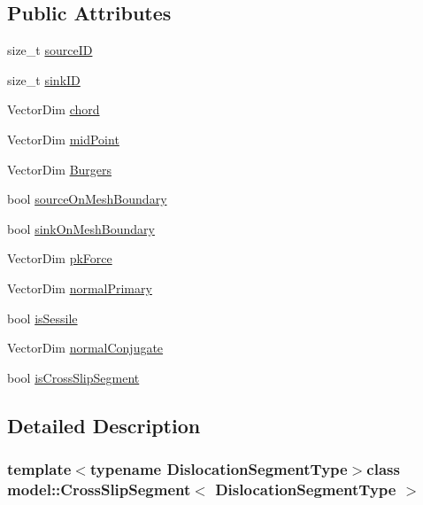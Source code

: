 \subsection*{Public Attributes}
\begin{DoxyCompactItemize}
\item 
size\+\_\+t \hyperlink{classmodel_1_1_cross_slip_segment_a0a277b3268dcf7ba49ddd61daefb96ac}{source\+I\+D}
\item 
size\+\_\+t \hyperlink{classmodel_1_1_cross_slip_segment_a6c2b804d97829bc801afe80eb1c7428c}{sink\+I\+D}
\item 
Vector\+Dim \hyperlink{classmodel_1_1_cross_slip_segment_a71dfabff3d1911aa136fe875a34c90a7}{chord}
\item 
Vector\+Dim \hyperlink{classmodel_1_1_cross_slip_segment_a98b6008d9c15bff7cf37114bcd7e0379}{mid\+Point}
\item 
Vector\+Dim \hyperlink{classmodel_1_1_cross_slip_segment_a0d54a7eda1f580b4109663c3f25aad66}{Burgers}
\item 
bool \hyperlink{classmodel_1_1_cross_slip_segment_abeda92bda81b647ea7aabda31427c748}{source\+On\+Mesh\+Boundary}
\item 
bool \hyperlink{classmodel_1_1_cross_slip_segment_a6eeaa170476f67a93823bc2e453b1bd2}{sink\+On\+Mesh\+Boundary}
\item 
Vector\+Dim \hyperlink{classmodel_1_1_cross_slip_segment_a3c41fc4abf7195d47e366fa0c4ebc008}{pk\+Force}
\item 
Vector\+Dim \hyperlink{classmodel_1_1_cross_slip_segment_a2373755ed86c97a3a9237878879f0122}{normal\+Primary}
\item 
bool \hyperlink{classmodel_1_1_cross_slip_segment_a181c56ee259c5172591f478612261dd8}{is\+Sessile}
\item 
Vector\+Dim \hyperlink{classmodel_1_1_cross_slip_segment_a831dece462b2badda4205a7f8b89a4ff}{normal\+Conjugate}
\item 
bool \hyperlink{classmodel_1_1_cross_slip_segment_ab6248fc68a3660d4208c7a72582199b8}{is\+Cross\+Slip\+Segment}
\end{DoxyCompactItemize}


\subsection{Detailed Description}
\subsubsection*{template$<$typename Dislocation\+Segment\+Type$>$class model\+::\+Cross\+Slip\+Segment$<$ Dislocation\+Segment\+Type $>$}



